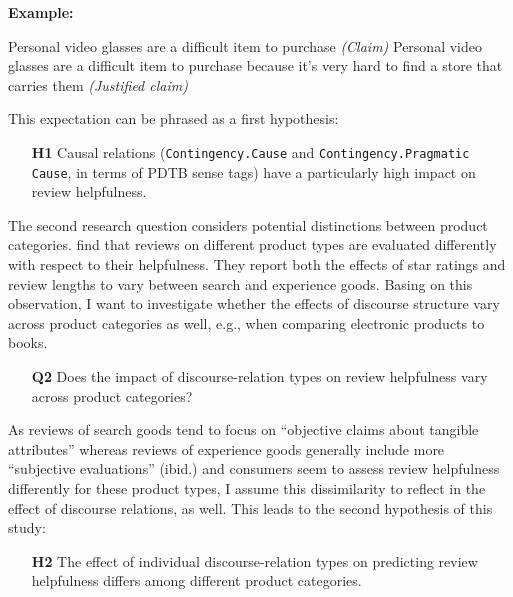 \documentclass[
    a4paper,%
    12pt,%
    oneside,%
    toc=bibliography,
    final,
]{scrartcl}
\begin{document}
\pagebreak
\textbf{Example:}
\vspace{-1em}

\begin{exe}
\ex Personal video glasses are a difficult item to purchase \textit{(Claim)}
\ex Personal video glasses are a difficult item to purchase because it’s very hard to find a store that carries them \textit{(Justified claim)}
\end{exe}
\vspace{-.5em}

This expectation can be phrased as a first hypothesis:

\begin{enumerate}[rightmargin=1cm]
\item[\textbf{H1}] Causal relations (\lstinline|Contingency.Cause| and \lstinline|Contingency.Pragmatic Cause|, in terms of PDTB sense tags) have a particularly high impact on review helpfulness.
\end{enumerate}

The second research question considers potential distinctions between product categories. \citet{MudambiSchuff2010} find that reviews on different product types are evaluated differently with respect to their helpfulness. They report both the effects of star ratings and review lengths to vary between search and experience goods. Basing on this observation, I want to investigate whether the effects of discourse structure vary across product categories as well, e.g., when comparing electronic products to books.

\begin{enumerate}[rightmargin=1cm]
\item[\textbf{Q2}] Does the impact of discourse-relation types on review helpfulness vary across product categories?
\end{enumerate}

As reviews of search goods tend to focus on “objective claims about tangible attributes” \citep[189]{MudambiSchuff2010} whereas reviews of experience goods generally include more “subjective evaluations” (ibid.) and consumers seem to assess review helpfulness differently for these product types, I assume this dissimilarity to reflect in the effect of discourse relations, as well. This leads to the second hypothesis of this study:

\begin{enumerate}[rightmargin=1cm]
\item[\textbf{H2}] The effect of individual discourse-relation types on predicting review helpfulness differs among different product categories.
\end{enumerate}
\end{document}

